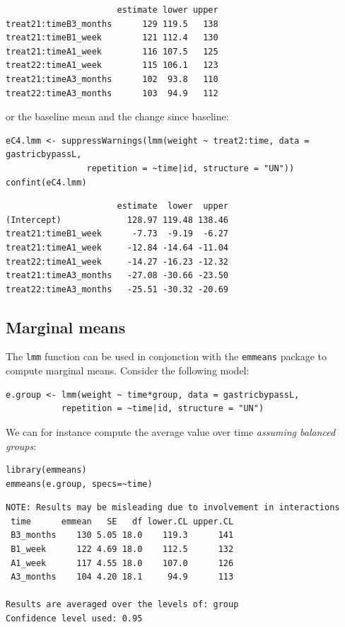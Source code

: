 \documentclass[12pt]{article}
\begin{document}
\begin{verbatim}
                      estimate lower upper
treat21:timeB3_months      129 119.5   138
treat21:timeB1_week        121 112.4   130
treat21:timeA1_week        116 107.5   125
treat22:timeA1_week        115 106.1   123
treat21:timeA3_months      102  93.8   110
treat22:timeA3_months      103  94.9   112
\end{verbatim}


or the baseline mean and the change since baseline:
\lstset{language=r,label= ,caption= ,captionpos=b,numbers=none}
\begin{lstlisting}
eC4.lmm <- suppressWarnings(lmm(weight ~ treat2:time, data = gastricbypassL,
				repetition = ~time|id, structure = "UN"))
confint(eC4.lmm)
\end{lstlisting}

\begin{verbatim}
                      estimate  lower  upper
(Intercept)             128.97 119.48 138.46
treat21:timeB1_week      -7.73  -9.19  -6.27
treat21:timeA1_week     -12.84 -14.64 -11.04
treat22:timeA1_week     -14.27 -16.23 -12.32
treat21:timeA3_months   -27.08 -30.66 -23.50
treat22:timeA3_months   -25.51 -30.32 -20.69
\end{verbatim}

\subsection{Marginal means}
\label{sec:org1f065ed}

The \texttt{lmm} function can be used in conjonction with the \texttt{emmeans}
package to compute marginal means. Consider the following model:
\lstset{language=r,label= ,caption= ,captionpos=b,numbers=none}
\begin{lstlisting}
e.group <- lmm(weight ~ time*group, data = gastricbypassL,
	       repetition = ~time|id, structure = "UN")
\end{lstlisting}

We can for instance compute the average value over time \emph{assuming balanced groups}:
\lstset{language=r,label= ,caption= ,captionpos=b,numbers=none}
\begin{lstlisting}
library(emmeans)
emmeans(e.group, specs=~time)
\end{lstlisting}

\begin{verbatim}
NOTE: Results may be misleading due to involvement in interactions
 time      emmean   SE   df lower.CL upper.CL
 B3_months    130 5.05 18.0    119.3      141
 B1_week      122 4.69 18.0    112.5      132
 A1_week      117 4.55 18.0    107.0      126
 A3_months    104 4.20 18.1     94.9      113

Results are averaged over the levels of: group 
Confidence level used: 0.95
\end{verbatim}
\end{document}
